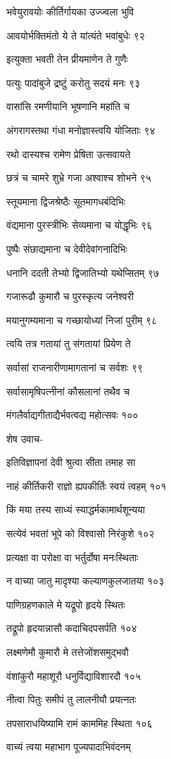 भवेयुरावयोः कीर्तिर्गायका उज्ज्वला भुवि

आवयोर्भक्तिमंतो ये ते यांत्यंते भवांबुधेः ९२

इत्युक्ता भवती तेन प्रीयमाणेन ते गुणैः

पत्युः पादांबुजे द्रष्टुं करोतु सदयं मनः ९३

वासांसि रमणीयानि भूषणानि महांति च

अंगरागस्तथा गंधा मनोज्ञास्त्वयि योजिताः ९४

रथो दास्यश्च रामेण प्रेषिता उत्सवायते

छत्रं च चामरे शुभ्रे गजा अश्वाश्च शोभने ९५

स्तूयमाना द्विजश्रेष्ठैः सूतमागधबंदिभिः

वंद्यमाना पुरस्त्रीभिः सेव्यमाना च योद्धृभिः ९६

पुष्पैः संछाद्यमाना च देवीदेवांगनादिभिः

धनानि ददती तेभ्यो द्विजातिभ्यो यथेप्सितम् ९७

गजारूढौ कुमारौ च पुरस्कृत्य जनेश्वरी

मयानुगम्यमाना च गच्छायोध्यां निजां पुरीम् ९८

त्वयि तत्र गतायां तु संगतायां प्रियेण ते

सर्वासां राजनारीणामागतानां च सर्वशः ९९

सर्वासामृषिपत्नीनां कौसलानां तथैव च

मंगलैर्वाद्यगीताद्यैर्भवत्वद्य महोत्सवः १००

शेष उवाच-

इतिविज्ञापनां देवी श्रुत्वा सीता तमाह सा

नाहं कीर्तिकरी राज्ञो ह्यपकीर्तिः स्वयं त्वहम् १०१

किं मया तस्य साध्यं स्याद्धर्मकामार्थशून्यया

सत्येवं भवतां भूपे को विश्वासो निरंकुशे १०२

प्रत्यक्षा वा परोक्षा वा भर्तुर्दोषा मनःस्थिताः

न वाच्या जातु मादृश्या कल्याणकुलजातया १०३

पाणिग्रहणकाले मे यद्रूपो हृदये स्थितः

तद्रूपो हृदयान्नासौ कदाचिदपसर्पति १०४

लक्ष्मणेमौ कुमारौ मे तत्तेजोंशसमुद्भवौ

वंशांकुरौ महाशूरौ धनुर्विद्याविशारदौ १०५

नीत्वा पितुः समीपं तु लालनीयौ प्रयत्नतः

तपसाराधयिष्यामि रामं काममिह स्थिता १०६

वाच्यं त्वया महाभाग पूज्यपादाभिवंदनम्


